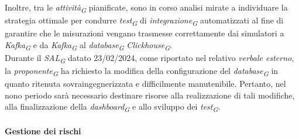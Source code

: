 Inoltre, tra le \textit{attività}\textsubscript{\textit{G}} pianificate, sono in corso analisi mirate a individuare la strategia ottimale per condurre \textit{test}\textsubscript{\textit{G}} di \textit{integrazione}\textsubscript{\textit{G}} automatizzati al fine di garantire che le misurazioni vengano trasmesse correttamente dai simulatori a \textit{Kafka}\textsubscript{\textit{G}} e da \textit{Kafka}\textsubscript{\textit{G}} al \textit{database}\textsubscript{\textit{G}} \textit{Clickhouse}\textsubscript{\textit{G}}. \\
Durante il \textit{SAL}\textsubscript{\textit{G}} datato 23/02/2024, come riportato nel relativo \textit{verbale esterno}, la \textit{proponente}\textsubscript{\textit{G}} ha richiesto la modifica della configurazione del \textit{database}\textsubscript{\textit{G}} in quanto ritenuta sovraingegnerizzata e difficilmente manutenibile. Pertanto, nel nono periodo sarà necessario destinare risorse alla realizzazione di tali modifiche, alla finalizzazione della \textit{dashboard}\textsubscript{\textit{G}} e allo sviluppo dei \textit{test}\textsubscript{\textit{G}}.

\paragraph{Gestione dei rischi} 


